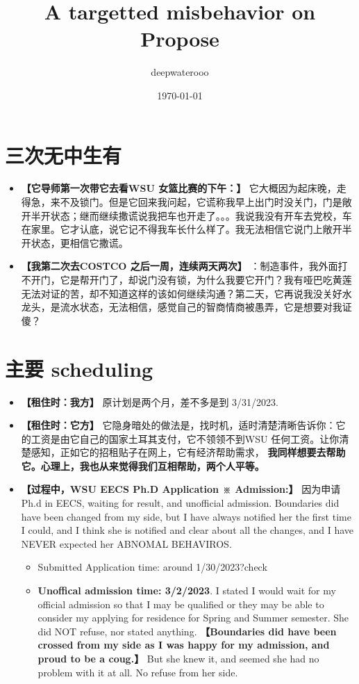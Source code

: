 \documentclass[9pt, b5paper]{article}
\author{deepwaterooo}
\date{\today}
\title{A targetted misbehavior on Propose}
\begin{document}
\maketitle
\tableofcontents


\section{三次无中生有}
\label{sec-1}
\begin{itemize}
\item \textbf{【它导师第一次带它去看WSU 女篮比赛的下午：】} 它大概因为起床晚，走得急，来不及锁门。但是它回来我问起，它谎称我早上出门时没关门，门是敞开半开状态；继而继续撒谎说我把车也开走了。。。我说我没有开车去党校，车在家里。它才认底，说它记不得我车长什么样了。我无法相信它说门上敞开半开状态，更相信它撒谎。
\item \textbf{【我第二次去COSTCO 之后一周，连续两天两次】} ：制造事件，我外面打不开门，它是帮开门了，却说门没有锁，为什么我要它开门？我有哑巴吃黄莲无法对证的苦，却不知道这样的该如何继续沟通？第二天，它再说我没关好水龙头，是流水状态，无法相信，感觉自己的智商情商被愚弄，它是想要对我证傻？
\end{itemize}
\section{主要 scheduling}
\label{sec-2}
\begin{itemize}
\item \textbf{【租住时：我方】} 原计划是两个月，差不多是到 3/31/2023.
\item \textbf{【租住时：它方】} 它隐身暗处的做法是，找时机，适时清楚清晰告诉你：它的工资是由它自己的国家土耳其支付，它不领领不到WSU 任何工资。让你清楚感知，正如它的招租贴子在网上，它有经济帮助需求， \textbf{我同样想要去帮助它。心理上，我也从来觉得我们互相帮助，两个人平等。}
\item \textbf{【过程中，WSU EECS Ph.D Application ※ Admission:】} 因为申请Ph.d in EECS, waiting for result, and unofficial admission. Boundaries did have been changed from my side, but I have always notified her the first time I could, and I think she is notified and clear about all the changes, and I have NEVER expected her ABNOMAL BEHAVIROS. 
\begin{itemize}
\item Submitted Application time: around 1/30/2023?check
\item \textbf{Unoffical admission time: 3/2/2023}. I stated I would wait for my official admission so that I may be qualified or they may be able to consider my applying for residence for Spring and Summer semester. She did NOT refuse, nor stated anything. \textbf{【Boundaries did have been crossed from my side as I was happy for my admission, and proud to be a coug.】}  But she knew it, and seemed she had no problem with it at all. No refuse from her side.
\end{itemize}
\end{itemize}
\end{document}

